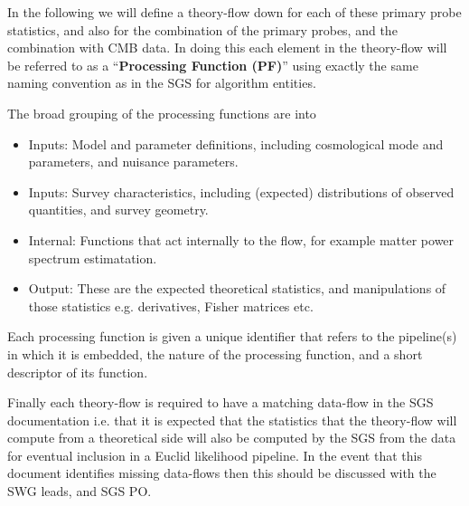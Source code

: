 In the following we will define a theory-flow down for each of these primary probe statistics, and also for the 
combination of the primary probes, and the combination with CMB data. In doing this 
each element in the theory-flow will be referred to as a ``{\bf Processing Function (PF)}'' using exactly the same 
naming convention as in the SGS for algorithm entities. 

The broad grouping of the processing functions are into
\begin{itemize}
\item 
Inputs: Model and parameter definitions, including cosmological mode and parameters, and nuisance parameters. 
\item 
Inputs: Survey characteristics, including (expected) distributions of observed quantities, and survey geometry.
\item 
Internal: Functions that act internally to the flow, for example matter power spectrum estimatation. 
\item 
Output: These are the expected theoretical statistics, and manipulations of those statistics e.g. derivatives, Fisher matrices etc. 
\end{itemize} 
Each processing function is given a unique identifier that refers to the pipeline(s) in which it is embedded, the nature 
of the processing function, and a short descriptor of its function. 

Finally each theory-flow is required to have a matching data-flow in the SGS documentation i.e. that it is expected that 
the statistics that the theory-flow will compute from a theoretical side will also be computed by the SGS 
from the data for eventual inclusion in a Euclid likelihood pipeline. In the event that this document identifies 
missing data-flows then this should be discussed with the SWG leads, and SGS PO. 

